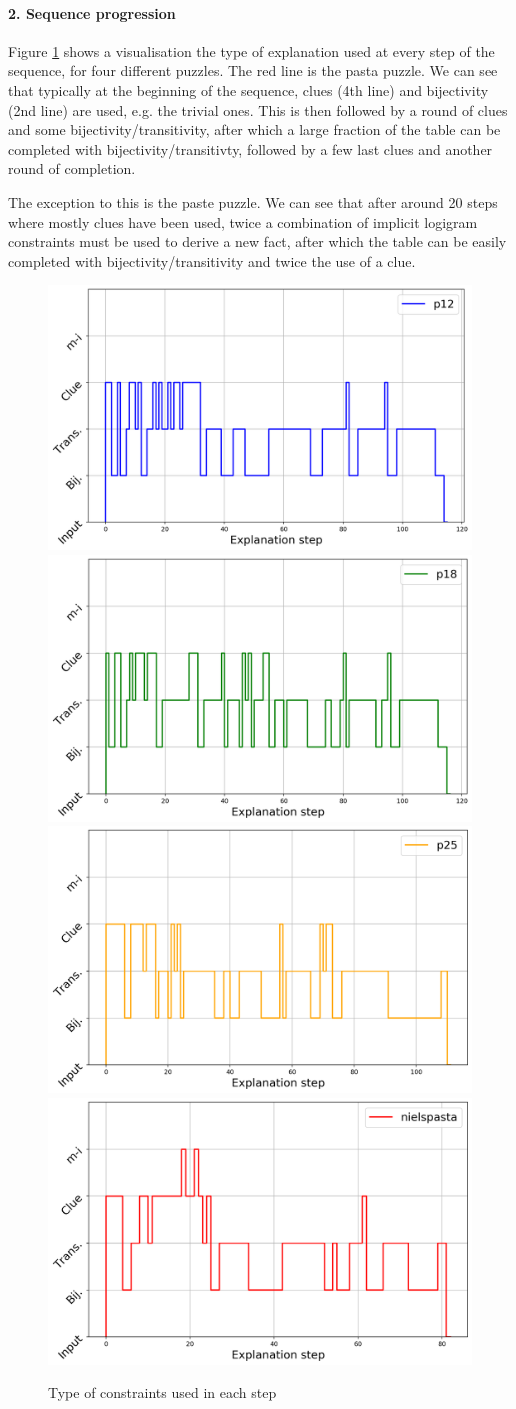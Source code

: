 \paragraph{2. Sequence progression}
Figure \ref{fig:steps} shows a visualisation the type of explanation used at every step of the sequence, for four different puzzles. The red line is the pasta puzzle. We can see that typically at the beginning of the sequence, clues (4th line) and bijectivity (2nd line) are used, e.g. the trivial ones. This is then followed by a round of clues and some bijectivity/transitivity, after which a large fraction of the table can be completed with bijectivity/transitivty, followed by a few last clues and another round of completion.

The exception to this is the paste puzzle. We can see that after around 20 steps where mostly clues have been used, twice a combination of implicit logigram constraints must be used to derive a new fact, after which the table can be easily completed with bijectivity/transitivity and twice the use of a clue.

\begin{figure}[t]
\centering
\includegraphics[width=0.49\linewidth]{figures/plot_cost_steps_p12}
\includegraphics[width=0.49\linewidth]{figures/plot_cost_steps_p18}
\includegraphics[width=0.49\linewidth]{figures/plot_cost_steps_p25}
\includegraphics[width=0.49\linewidth]{figures/plot_cost_steps_nielspasta}
\caption{Type of constraints used in each step}
\label{fig:steps}
\end{figure}

